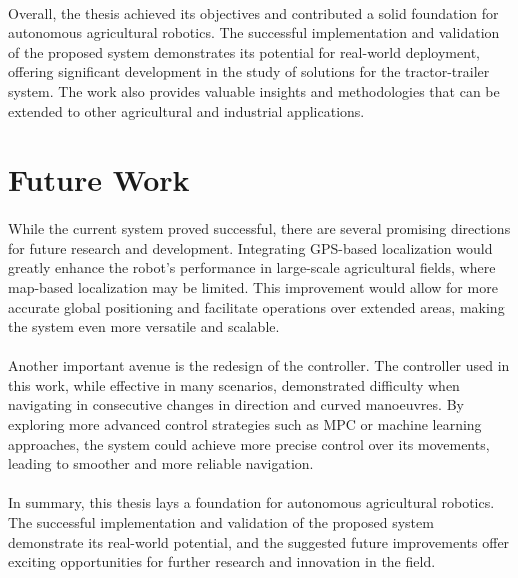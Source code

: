 \paragraph{}Overall, the thesis achieved its objectives and contributed a solid foundation for autonomous agricultural 
robotics. The successful implementation and validation of the proposed system demonstrates its potential for real-world 
deployment, offering significant development in the study of solutions for the tractor-trailer system. 
The work also provides valuable insights and methodologies that can be extended to other agricultural and 
industrial applications.


\section{Future Work}
\label{sec:future_work}
\paragraph{}While the current system proved successful, there are several promising directions 
for future research and development. Integrating GPS-based localization would greatly enhance 
the robot's performance in large-scale agricultural fields, where map-based localization 
may be limited. This improvement would allow for more accurate global positioning and 
facilitate operations over extended areas, making the system even more versatile and scalable.

\paragraph{}Another important avenue is the redesign of the controller. The controller used 
in this work, while effective in many scenarios, demonstrated difficulty when navigating in consecutive 
changes in direction and curved manoeuvres. By exploring more advanced control strategies 
such as \gls{MPC} or machine learning approaches, the system could achieve more precise 
control over its movements, leading to smoother and more reliable navigation.

\paragraph{}In summary, this thesis lays a foundation for autonomous 
agricultural robotics. The successful implementation and validation of the proposed 
system demonstrate its real-world potential, and the suggested future improvements offer 
exciting opportunities for further research and innovation in the field.

